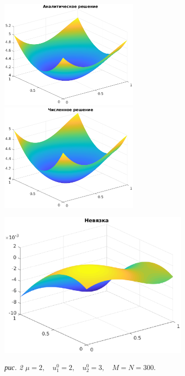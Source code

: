 \documentclass[11pt]{article}
\begin{document}
\newpage
\noindent
\includegraphics[width=0.51\textwidth]{sol_a_2.eps}
\includegraphics[width=0.51\textwidth]{sol_n_2.eps}
\begin{center}
\includegraphics[width=0.7\textwidth]{resid2.eps}

\it{рис. 2 \quad $\mu = 2, \quad u_1^0 = 2, \quad u_2^0 = 3, \quad M = N = 300.$}
\end{center}
\end{document}
